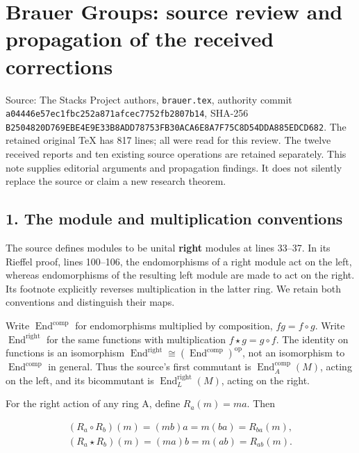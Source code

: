 \section{Brauer Groups: source review and propagation of the received corrections}\label{brauer-groups-source-review-and-propagation-of-the-received-corrections}

Source: The Stacks Project authors, \texttt{brauer.tex}, authority commit \texttt{a04446e5\allowbreak{}7ec1fbc2\allowbreak{}52a871af\allowbreak{}cec7752f\allowbreak{}b2807b14}, SHA-256 \texttt{B2504820\allowbreak{}D769EBE4\allowbreak{}E9E33B8A\allowbreak{}DD78753F\allowbreak{}B30ACA6E\allowbreak{}8A7F75C8\allowbreak{}D54DDA88\allowbreak{}5EDCD682}. The retained original TeX has 817 lines; all were read for this review. The twelve received reports and ten existing source operations are retained separately. This note supplies editorial arguments and propagation findings. It does not silently replace the source or claim a new research theorem.

\subsection{1. The module and multiplication conventions}\label{the-module-and-multiplication-conventions}

The source defines modules to be unital \textbf{right} modules at lines 33--37. In its Rieffel proof, lines 100--106, the endomorphisms of a right module act on the left, whereas endomorphisms of the resulting left module are made to act on the right. Its footnote explicitly reverses multiplication in the latter ring. We retain both conventions and distinguish their maps.

Write \(\operatorname{End}^{\mathrm{comp}}\) for endomorphisms multiplied by composition, \(f g = f \circ  g\). Write \(\operatorname{End}^{\mathrm{right}}\) for the same functions with multiplication \(f \star  g = g \circ  f\). The identity on functions is an isomorphism \(\operatorname{End}^{\mathrm{right}} \cong  (\operatorname{End}^{\mathrm{comp}})^{\mathrm{op}}\), not an isomorphism to \(\operatorname{End}^{\mathrm{comp}}\) in general. Thus the source's first commutant is \(\operatorname{End}_{A}^{\mathrm{comp}}(M)\), acting on the left, and its bicommutant is \(\operatorname{End}_{L}^{\mathrm{right}}(M)\), acting on the right.

For the right action of any ring A, define \(R_{a}(m)=ma\). Then

\[\begin{gathered}
(R_{a} \circ R_{b})(m) = (mb)a = m(ba) = R_{ba}(m),\\(R_{a} \star R_{b})(m) = (ma)b = m(ab) = R_{ab}(m).
\end{gathered}\]

